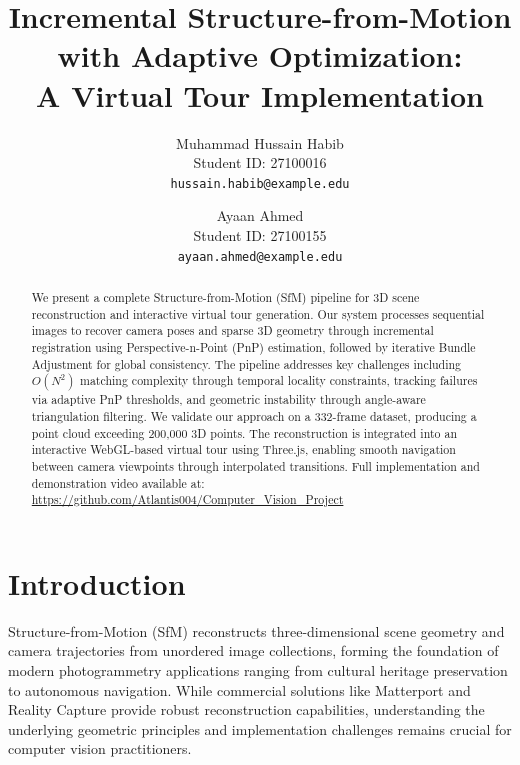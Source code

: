 \documentclass[10pt,twocolumn,letterpaper]{article}
\begin{document}
\title{Incremental Structure-from-Motion with Adaptive Optimization:\\A Virtual Tour Implementation}

\author{Muhammad Hussain Habib\\
Student ID: 27100016\\
{\tt\small hussain.habib@example.edu}
\and
Ayaan Ahmed\\
Student ID: 27100155\\
{\tt\small ayaan.ahmed@example.edu}
}

\maketitle

\begin{abstract}
We present a complete Structure-from-Motion (SfM) pipeline for 3D scene reconstruction and interactive virtual tour generation. Our system processes sequential images to recover camera poses and sparse 3D geometry through incremental registration using Perspective-n-Point (PnP) estimation, followed by iterative Bundle Adjustment for global consistency. The pipeline addresses key challenges including $O(N^2)$ matching complexity through temporal locality constraints, tracking failures via adaptive PnP thresholds, and geometric instability through angle-aware triangulation filtering. We validate our approach on a 332-frame dataset, producing a point cloud exceeding 200,000 3D points. The reconstruction is integrated into an interactive WebGL-based virtual tour using Three.js, enabling smooth navigation between camera viewpoints through interpolated transitions. Full implementation and demonstration video available at: \url{https://github.com/Atlantis004/Computer_Vision_Project}
\end{abstract}

\section{Introduction}

Structure-from-Motion (SfM) reconstructs three-dimensional scene geometry and camera trajectories from unordered image collections, forming the foundation of modern photogrammetry applications ranging from cultural heritage preservation to autonomous navigation. While commercial solutions like Matterport and Reality Capture provide robust reconstruction capabilities, understanding the underlying geometric principles and implementation challenges remains crucial for computer vision practitioners.
\end{document}
